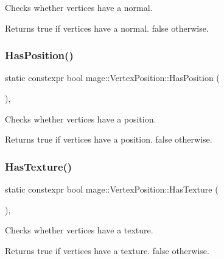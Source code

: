 Checks whether vertices have a normal.

\begin{DoxyReturn}{Returns}
{\ttfamily true} if vertices have a normal. {\ttfamily false} otherwise. 
\end{DoxyReturn}
\hypertarget{structmage_1_1_vertex_position_ab99ff01bb689bf62f693f13212d673ad}{}\label{structmage_1_1_vertex_position_ab99ff01bb689bf62f693f13212d673ad} 
\subsubsection{\texorpdfstring{Has\+Position()}{HasPosition()}}
{\footnotesize\ttfamily static constexpr bool mage\+::\+Vertex\+Position\+::\+Has\+Position (\begin{DoxyParamCaption}{ }\end{DoxyParamCaption})\hspace{0.3cm}{\ttfamily [static]}, {\ttfamily [noexcept]}}

Checks whether vertices have a position.

\begin{DoxyReturn}{Returns}
{\ttfamily true} if vertices have a position. {\ttfamily false} otherwise. 
\end{DoxyReturn}
\hypertarget{structmage_1_1_vertex_position_a593c015184b164cf9bcf82938d4db39f}{}\label{structmage_1_1_vertex_position_a593c015184b164cf9bcf82938d4db39f} 
\subsubsection{\texorpdfstring{Has\+Texture()}{HasTexture()}}
{\footnotesize\ttfamily static constexpr bool mage\+::\+Vertex\+Position\+::\+Has\+Texture (\begin{DoxyParamCaption}{ }\end{DoxyParamCaption})\hspace{0.3cm}{\ttfamily [static]}, {\ttfamily [noexcept]}}

Checks whether vertices have a texture.

\begin{DoxyReturn}{Returns}
{\ttfamily true} if vertices have a texture. {\ttfamily false} otherwise. 
\end{DoxyReturn}
\hypertarget{structmage_1_1_vertex_position_a1d4d4c85a0aaae40a7d7d50f9873f6ef}{}\label{structmage_1_1_vertex_position_a1d4d4c85a0aaae40a7d7d50f9873f6ef} 
